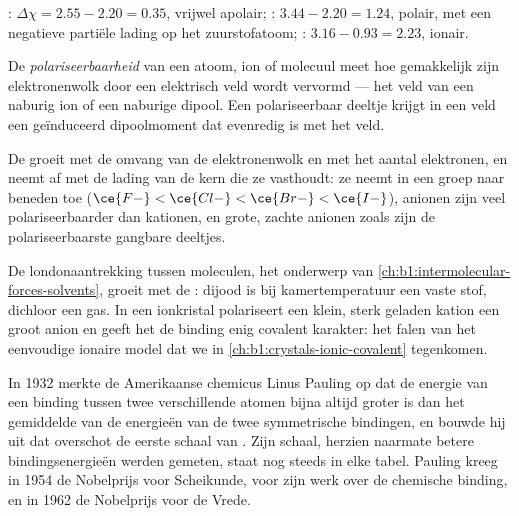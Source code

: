 \begin{example}\label{ex:b1:periodicity:bonds}
: $\Delta\chi = 2.55 - 2.20 = 0.35$, vrijwel apolair;
: $3.44 - 2.20 = 1.24$, polair, met een negatieve partiële
lading op het zuurstofatoom; : $3.16 - 0.93 = 2.23$, ionair.
\end{example}


\begin{definition}[Polariseerbaarheid]\label{def:b1:periodicity:polarisability}
De \emph{polariseerbaarheid} van een atoom, ion
of molecuul meet hoe gemakkelijk zijn elektronenwolk door een elektrisch
veld wordt vervormd --- het veld van een naburig ion of een naburige
dipool. Een polariseerbaar deeltje krijgt in een veld een geïnduceerd
dipoolmoment dat evenredig is met het veld.
\end{definition}

\begin{proposition}\label{prop:b1:periodicity:polarisability-trend}
De  groeit met de omvang van de elektronenwolk en met
het aantal elektronen, en neemt af met de lading van de kern die ze
vasthoudt: ze neemt in een groep naar beneden toe ($\ce{F-} < \ce{Cl-} < \ce{Br-} <
\ce{I-}$), anionen zijn veel polariseerbaarder dan kationen, en grote,
zachte anionen zoals  zijn de polariseerbaarste gangbare
deeltjes.
\end{proposition}

\begin{example}\label{ex:b1:periodicity:pol}
De londonaantrekking tussen moleculen, het onderwerp van
\cref{ch:b1:intermolecular-forces-solvents}, groeit met de
: dijood is bij kamertemperatuur een vaste stof,
dichloor een gas. In een ionkristal polariseert een klein, sterk geladen
kation een groot anion en geeft het de binding enig covalent karakter:
het falen van het eenvoudige ionaire model dat we in
\cref{ch:b1:crystals-ionic-covalent} tegenkomen.
\end{example}

\begin{history}
In 1932 merkte de Amerikaanse chemicus Linus Pauling op dat de energie
van een binding tussen twee verschillende atomen bijna altijd groter is
dan het gemiddelde van de energieën van de twee symmetrische bindingen,
en bouwde hij uit dat overschot de eerste schaal van .
Zijn schaal, herzien naarmate betere bindingsenergieën werden gemeten,
staat nog steeds in elke tabel. Pauling kreeg in 1954 de Nobelprijs voor
Scheikunde, voor zijn werk over de chemische binding, en in 1962 de
Nobelprijs voor de Vrede.
\end{history}

